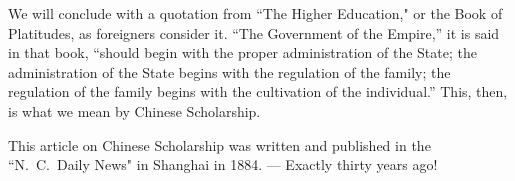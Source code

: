 We will conclude with a quotation from ``The Higher Education," or the Book of Platitudes, as foreigners consider it.
``The Government of the Empire,'' it is said in that book, ``should begin with the proper administration of the State; the administration of the State begins with the regulation of the family; the regulation of the family begins with the cultivation of the individual.''
This, then, is what we mean by Chinese Scholarship.

\vfill
{\footnotesize This article on Chinese Scholarship was written and published in the ``N.~C.~Daily News" in Shanghai in 1884. --- Exactly thirty years ago!}
